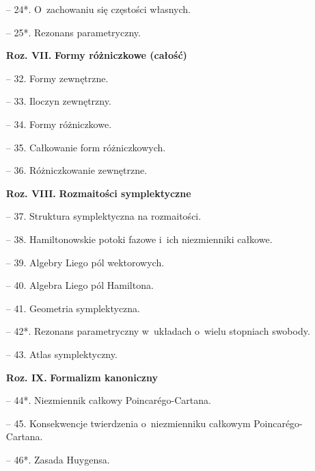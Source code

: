 \documentclass[a4paper,11pt]{article}
\begin{document}
\begin{itemize}
\item[--] 24*. O~zachowaniu się częstości własnych.

\item[--] 25*. Rezonans parametryczny.


\item[\textbf{Roz. VII.}] \textbf{Formy różniczkowe (całość)}

\item[--] 32. Formy zewnętrzne.

\item[--] 33. Iloczyn zewnętrzny.

\item[--] 34. Formy różniczkowe.

\item[--] 35. Całkowanie form różniczkowych.

\item[--] 36. Różniczkowanie zewnętrzne.


\item[\textbf{Roz. VIII.}] \textbf{Rozmaitości symplektyczne}

\item[--] 37. Struktura symplektyczna na rozmaitości.

\item[--] 38. Hamiltonowskie potoki fazowe i~ich niezmienniki całkowe.

\item[--] 39. Algebry Liego pól wektorowych.

\item[--] 40. Algebra Liego pól Hamiltona.

\item[--] 41. Geometria symplektyczna.

\item[--] 42*. Rezonans parametryczny w~układach o~wielu stopniach
  swobody.

\item[--] 43. Atlas symplektyczny.


\item[\textbf{Roz. IX.}] \textbf{Formalizm kanoniczny}

\item[--] 44*. Niezmiennik całkowy Poincar\'{e}go-Cartana.

\item[--] 45. Konsekwencje twierdzenia o~niezmienniku całkowym
  Poincar\'{e}go-Cartana.

\item[--] 46*. Zasada Huygensa.


\end{itemize}
\end{document}

